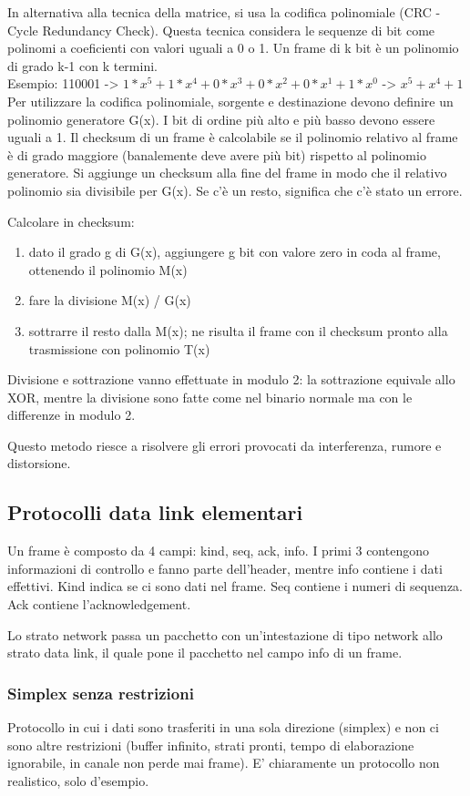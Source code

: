 In alternativa alla tecnica della matrice, si usa la codifica polinomiale (CRC - Cycle Redundancy Check).
Questa tecnica considera le sequenze di bit come polinomi a coeficienti con valori uguali a 0 o 1.
Un frame di k bit è un polinomio di grado k-1 con k termini.\\
Esempio: 110001 -> $1*x^5+1*x^4+0*x^3+0*x^2+0*x^1+1*x^0$ -> $x^5+x^4+1$\\

Per utilizzare la codifica polinomiale, sorgente e destinazione devono definire un polinomio generatore G(x).
I bit di ordine più alto e più basso devono essere uguali a 1.
Il checksum di un frame è calcolabile se il polinomio relativo al frame è di grado maggiore (banalemente deve avere più bit) rispetto al polinomio generatore.
Si aggiunge un checksum alla fine del frame in modo che il relativo polinomio sia divisibile per G(x).
Se c'è un resto, significa che c'è stato un errore.

Calcolare in checksum:
\begin{enumerate}
    \item dato il grado g di G(x), aggiungere g bit con valore zero in coda al frame, ottenendo il polinomio M(x)
    \item fare la divisione M(x) / G(x)
    \item sottrarre il resto dalla M(x); ne risulta il frame con il checksum pronto alla trasmissione con polinomio T(x)
\end{enumerate}
Divisione e sottrazione vanno effettuate in modulo 2: la sottrazione equivale allo XOR, mentre la divisione sono fatte come nel binario normale ma con le differenze in modulo 2.

Questo metodo riesce a risolvere gli errori provocati da interferenza, rumore e distorsione.

\subsection{Protocolli data link elementari} %
Un frame è composto da 4 campi: kind, seq, ack, info.
I primi 3 contengono informazioni di controllo e fanno parte dell'header, mentre info contiene i dati effettivi.
Kind indica se ci sono dati nel frame. Seq contiene i numeri di sequenza. Ack contiene l'acknowledgement.

Lo strato network passa un pacchetto con un'intestazione di tipo network allo strato data link, il quale pone il pacchetto nel campo info di un frame.

\subsubsection{Simplex senza restrizioni}
Protocollo in cui i dati sono trasferiti in una sola direzione (simplex) e non ci sono altre restrizioni
(buffer infinito, strati pronti, tempo di elaborazione ignorabile, in canale non perde mai frame).
E' chiaramente un protocollo non realistico, solo d'esempio.

